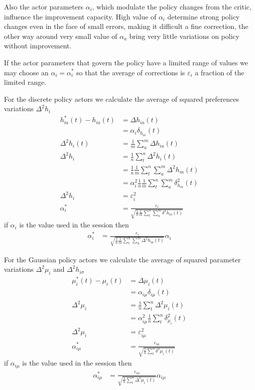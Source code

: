 \documentclass[]{article}
\begin{document}
Also the actor parameters $ \alpha_i $, which modulate the policy changes from the critic, influence the improvement capacity.
High value of $ \alpha_i $ determine strong policy changes even in the face of small errors, making it difficult a fine correction, the other way around very small value of $ \alpha_a $ bring very little variations on policy without improvement.

If the actor parameters that govern the policy have a limited range of values we may choose an $ \alpha_i = \alpha^*_i $ so that the average of corrections is $ \varepsilon_i $ a fraction of the limited range.

For the discrete policy actors we calculate the average of squared preferences variations $ \Delta^2h_{i} $
\begin{align*}
	h^*_{ia}(t) - h_{ia}(t)&=	\Delta h_{ia}(t)
	\\
	&=	\alpha_i \delta_{h_{ia}}(t)
	\\
	\Delta^2h_{i}(t)&=			\frac{1}{m} \sum_a^m \Delta h_{ia}(t)
	\\
	\Delta^2h_{i}&=			\frac{1}{n} \sum_t^n \Delta^2 h_{i}(t)
	\\
	&=			\frac{1}{n}\frac{1}{m}\sum_t^n \sum_a^m \Delta^2 h_{ia}(t)
	\\
	&=	\alpha^2_i\frac{1}{n}\frac{1}{m}\sum_t^n \sum_a^m  \delta^2_{h_{ia}}(t)
	\\
	\Delta^2h_i &=	\varepsilon^2_i
	\\
	\alpha^*_i&=	\frac{\varepsilon_i}{\sqrt{\frac{1}{n} \frac{1}{m}\sum_t^n \sum_a^m \delta^2 h_{ia}(t)}}
\end{align*}
if $ \alpha_i $ is the value used in the session then
\begin{align}
	\alpha^*_i&=	\frac{\varepsilon_i}{\sqrt{\frac{1}{n} \frac{1}{m} \sum_t^n \sum_a^m \Delta^2 h_{ia}(t)}} \alpha_i
\end{align}

For the Gaussian policy actors we calculate the average of squared parameter variations $ \Delta^2\mu_i$ and $ \Delta^2 h_{i\sigma} $
\begin{align*}
	\mu^*_i(t) - \mu_i(t)&=	\Delta \mu_i(t)
	\\
	&=	\alpha_{i\mu} \delta_{i\mu}(t)
	\\
	\Delta^2\mu_{i}&=			\frac{1}{n} \sum_t^n \Delta^2 \mu_i(t)
	\\
	&=	\alpha^2_{i\mu}\frac{1}{n}\sum_t^n  \delta^2_{\mu_{i}}(t)
	\\
	\Delta^2\mu_i &=	\varepsilon^2_{i\mu}
	\\
	\alpha^*_{i\mu}&=	\frac{\varepsilon_{i\mu}}{\sqrt{\frac{1}{n} \sum_t^n \delta^2 \mu_i(t)}}
\end{align*}
if $ \alpha_{i\mu} $ is the value used in the session then
\begin{align}
	\alpha^*_{i\mu}&=	\frac{\varepsilon_{i\mu}}{\sqrt{\frac{1}{n} \sum_t^n  \Delta^2 \mu_i(t)}} \alpha_{i\mu}
\end{align}
\end{document}
